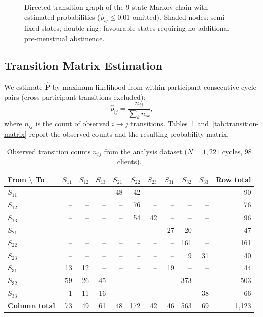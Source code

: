 \documentclass[12pt,a4paper]{article}
\newcommand{\mat}[1]{\mathbf{#1}}
\begin{document}
\begin{figure}[ht]
\caption{Directed transition graph of the 9-state Markov chain with estimated
probabilities ($\hat{p}_{ij} \le 0.01$ omitted).
Shaded nodes: semi-fixed states; double-ring: favourable states
requiring no additional pre-menstrual abstinence.}
\label{fig:state-diagram}
\end{figure}

\subsection{Transition Matrix Estimation}

We estimate $\hat{\mat{P}}$ by maximum likelihood from within-participant
consecutive-cycle pairs (cross-participant transitions excluded):
\[
  \hat{p}_{ij} = \frac{n_{ij}}{\sum_k n_{ik}},
\]
where $n_{ij}$ is the count of observed $i \to j$ transitions.
Tables~\ref{tab:transition-counts} and~\ref{tab:transition-matrix} report
the observed counts and the resulting probability matrix.

\begin{table}[ht]
\centering
\caption{Observed transition counts $n_{ij}$ from the analysis dataset
         ($N=1{,}221$ cycles, 98 clients).}
\label{tab:transition-counts}
\setlength{\tabcolsep}{5pt}
\begin{tabular}{l rrr rrr rrr r}
\toprule
\textbf{From $\setminus$ To} &
  $S_{11}$ & $S_{12}$ & $S_{13}$ &
  $S_{21}$ & $S_{22}$ & $S_{23}$ &
  $S_{31}$ & $S_{32}$ & $S_{33}$ & \textbf{Row total} \\
\midrule
$S_{11}$ &-- &-- &-- & 48 & 42 &-- &-- &-- &-- &  90 \\
$S_{12}$ &-- &-- &-- &-- & 76 &-- &-- &-- &-- &  76 \\
$S_{13}$ &-- &-- &-- &-- & 54 & 42 &-- &-- &-- &  96 \\
$S_{21}$ &-- &-- &-- &-- &-- &-- & 27 & 20 &-- &  47 \\
$S_{22}$ &-- &-- &-- &-- &-- &-- &-- & 161&-- & 161 \\
$S_{23}$ &-- &-- &-- &-- &-- &-- &-- & 9  & 31&  40 \\
$S_{31}$ & 13& 12&-- &-- &-- &-- & 19 &-- &-- &  44 \\
$S_{32}$ & 59& 26& 45&-- &-- &-- &-- & 373&-- & 503 \\
$S_{33}$ & 1 & 11& 16&-- &-- &-- &-- &-- & 38&  66 \\
\midrule
\textbf{Column total} & 73 & 49 & 61 & 48 & 172& 42 & 46 & 563& 69 &
  1{,}123 \\
\bottomrule
\end{tabular}
\end{table}
\end{document}
